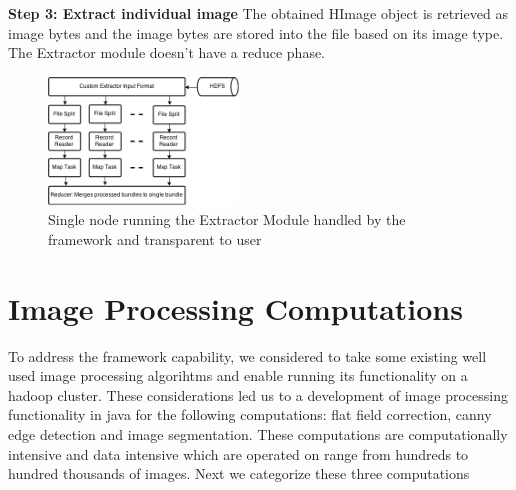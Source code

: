 \documentclass[conference]{IEEEtran}
\begin{document}
\textbf{Step 3: Extract individual image}
The obtained HImage object is retrieved as image bytes and the image bytes are stored into the file based on its image type. The Extractor module doesn't have a reduce phase.

\begin{figure}[h]
	\centering
	\includegraphics[width=0.45\textwidth]{ext-node}
	\caption{Single node running the Extractor Module handled by the framework and transparent to user}
	\label{fig:ext-node}
\end{figure}


\section{Image Processing Computations}
To address the framework capability, we considered to take some existing well used image processing algorihtms and enable running its functionality on a hadoop cluster. These considerations led us to a development of image processing functionality in java for the following computations: flat field correction, canny edge detection and image segmentation. These computations are computationally intensive and data intensive which are operated on range from hundreds to hundred thousands of images. Next we categorize these three computations


\end{document}
